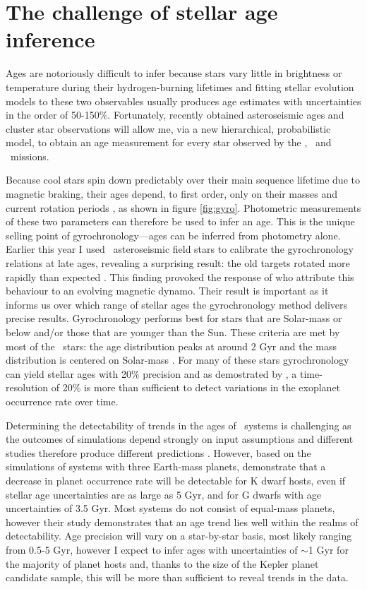 \section{The challenge of stellar age inference}

Ages are notoriously difficult to infer because stars vary little in brightness
or temperature during their hydrogen-burning lifetimes and fitting stellar
evolution models to these two observables usually produces age estimates with
uncertainties in the order of 50-150\%.
Fortunately, recently obtained asteroseismic ages and cluster star
observations will allow me, via a new hierarchical, probabilistic model,
to obtain an age measurement for every star observed by the \kepler,
\Ktwo\ and \TESS\ missions.

Because cool stars spin down predictably over their main sequence lifetime
due to magnetic braking, their ages depend, to first order, only on
their masses and current rotation periods \citep[e.g.][]{skumanich, kawaler,
barnes}, as shown in figure \ref{fig:gyro}.
Photometric measurements of these two parameters can therefore be used to
infer an age.
This is the unique selling point of gyrochronology---ages can be inferred from
photometry alone.
Earlier this year I used \Kepler\ asteroseismic field stars to calibrate
the gyrochronology relations at late ages, revealing a surprising result: the
old targets rotated more rapidly than expected \citep{angus}.
This finding provoked the response of \citet{vansaders} who attribute this
behaviour to an evolving magnetic dynamo.
Their result is important as it informs us over which range of stellar ages
the gyrochronology method delivers precise results.
Gyrochronology performs best for stars that are Solar-mass or below and/or
those that are younger than the Sun.
These criteria are met by most of the \Kepler\ stars: the age distribution
peaks at around 2 Gyr and the mass distribution is centered on Solar-mass
\citep{walk, mcquillan2014}.
For many of these stars gyrochronology can yield stellar ages with 20\%
precision \citep{epstein} and as demostrated by \citet{veras},
a time-resolution of 20\% is more than sufficient to detect variations in the
exoplanet occurrence rate over time.

Determining the detectability of trends in the ages of \Kepler\ systems is
challenging as the outcomes of simulations depend strongly on input
assumptions and different studies therefore produce different predictions
\citep[see figure 3 of][]{Pu2015}.
However, based on the \citet{smith} simulations of systems with three
Earth-mass planets, \citet{veras} demonstrate that a decrease in planet
occurrence rate will be detectable for K dwarf hosts, even if stellar age
uncertainties are as large as 5 Gyr, and for G dwarfs with age uncertainties of
3.5 Gyr.
Most systems do not consist of equal-mass planets, however their study
demonstrates that an age trend lies well within the realms of detectability.
Age precision will vary on a star-by-star basis, most likely ranging from
0.5-5 Gyr, however I expect to infer ages with uncertainties of $\sim$1 Gyr
for the majority of planet hosts and, thanks to the size of the Kepler planet
candidate sample, this will be more than sufficient to reveal trends in the
data.

